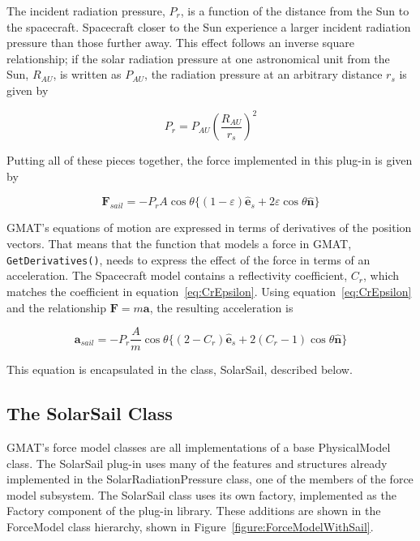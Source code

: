 The incident radiation pressure, $P_r$, is a function of the distance from the
Sun to the spacecraft.  Spacecraft closer to the Sun experience a larger
incident radiation pressure than those further away.  This effect follows an
inverse square relationship; if the solar radiation pressure at one astronomical
unit from the Sun, $R_{AU}$, is written as $P_{AU}$, the radiation pressure at
an arbitrary distance $r_s$ is given by

\begin{equation}
P_r = P_{AU} \left(\frac{R_{AU}}{r_s}\right)^2
\end{equation}

Putting all of these pieces together, the force implemented in this plug-in is
given by

\begin{equation}
\textbf{F}_{sail} = -P_r A \cos\theta \{(1 -
\varepsilon) \hat{\textbf{e}}_s + 2 \varepsilon \cos\theta \hat{\textbf{n}}\}
\end{equation}

GMAT's equations of motion are expressed in terms of derivatives of the position
vectors.  That means that the function that models a force in GMAT,
\texttt{GetDerivatives()}, needs to express the effect of the force in terms of
an acceleration.  The Spacecraft model contains a reflectivity coefficient,
$C_r$, which matches the coefficient in equation~\ref{eq:CrEpsilon}. Using
equation~\ref{eq:CrEpsilon} and the relationship $\textbf{F} = m\textbf{a}$, the
resulting acceleration is

\begin{equation}
\textbf{a}_{sail} = -P_r \frac{A}{m} \cos\theta \{(2 -
C_r) \hat{\textbf{e}}_s + 2 (C_r - 1) \cos\theta \hat{\textbf{n}}\}
\end{equation}

\noindent This equation is encapsulated in the class, SolarSail, described below.

\subsection{The SolarSail Class}

GMAT's force model classes are all implementations of a base PhysicalModel
class. The SolarSail plug-in uses many of the features and structures already
implemented in the SolarRadiationPressure class, one of the members of the force
model subsystem.  The SolarSail class uses its own factory, implemented as the
Factory component of the plug-in library.  These additions are shown in the
ForceModel class hierarchy, shown in Figure~\ref{figure:ForceModelWithSail}.

